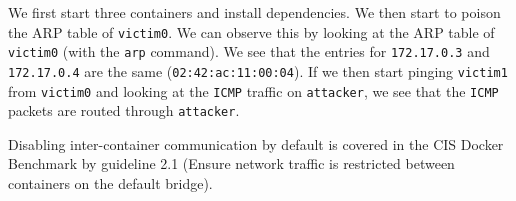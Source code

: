 We first start three containers and install dependencies. We then start to poison the ARP table of \lstinline{victim0}. We can observe this by looking at the ARP table of \lstinline{victim0} (with the \lstinline{arp} command). We see that the entries for \lstinline{172.17.0.3} and \lstinline{172.17.0.4} are the same (\lstinline{02:42:ac:11:00:04}). If we then start pinging \lstinline{victim1} from \lstinline{victim0} and looking at the \lstinline{ICMP} traffic on \lstinline{attacker}, we see that the \lstinline{ICMP} packets are routed through \lstinline{attacker}.

\medskip

Disabling inter-container communication by default is covered in the CIS Docker Benchmark by guideline 2.1 (Ensure network traffic is restricted between containers on the default bridge).
